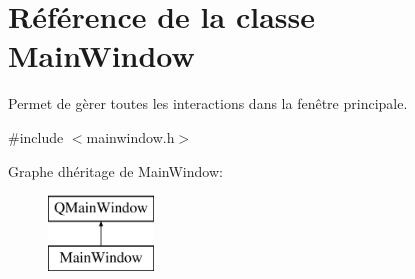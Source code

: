 \hypertarget{class_main_window}{}\section{Référence de la classe Main\+Window}
\label{class_main_window}


Permet de gèrer toutes les interactions dans la fenêtre principale.  




{\ttfamily \#include $<$mainwindow.\+h$>$}

Graphe d\textquotesingle{}héritage de Main\+Window\+:\begin{figure}[H]
\begin{center}
\leavevmode
\includegraphics[height=2.000000cm]{class_main_window}
\end{center}
\end{figure}
